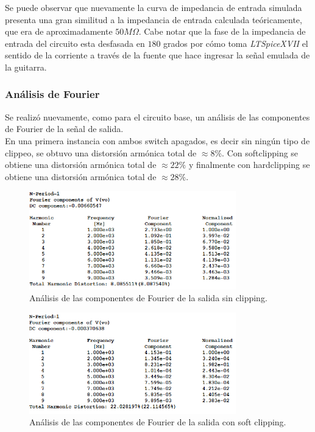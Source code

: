 Se puede observar que nuevamente la curva de impedancia de entrada simulada presenta una gran similitud a la impedancia de entrada calculada teóricamente, que era de aproximadamente $50M\Omega$. Cabe notar que la fase de la impedancia de entrada del circuito esta desfasada en $180$ grados por cómo toma {\textit{LTSpiceXVII}} el sentido de la corriente a través de la fuente que hace ingresar la señal emulada de la guitarra.

\subsubsection{Análisis de Fourier}
Se realizó nuevamente, como para el circuito base, un análisis de las componentes de Fourier de la señal de salida.\\

En una primera instancia con ambos switch apagados, es decir sin ningún tipo de clippeo, se obtuvo una distorsión armónica total de $\approx 8\%$. Con softclipping se obtiene una distorsión armónica total de $\approx 22\%$ y finalmente con hardclipping se obtiene una distorsión armónica total de $\approx 28\%$.

     \begin{figure}[H]
         \centering
         \includegraphics[width=0.8\textwidth, trim={0 0 0 0}, clip]{Ejercicio5/Imagenes/Circuito_base/Sim/circuito_propuesto_fourier_alone.png}
         \caption{Análisis de las componentes de Fourier de la salida sin clipping.}
         \label{fig:four_alone}
     \end{figure}


     \begin{figure}[H]
         \centering
         \includegraphics[width=0.8\textwidth, trim={0 0 0 0}, clip]{Ejercicio5/Imagenes/Circuito_base/Sim/circuito_propuesto_fourier_soft.png}
         \caption{Análisis de las componentes de Fourier de la salida con soft clipping.}
         \label{fig:four_soft}
     \end{figure}


